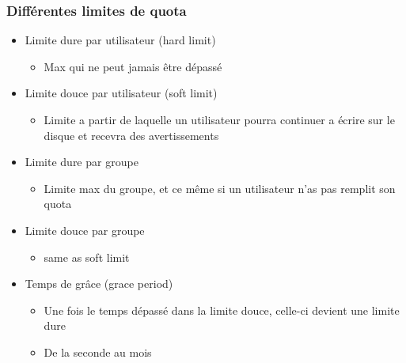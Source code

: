 \documentclass[a4paper]{article}
\begin{document}
      \subsubsection{Différentes limites de quota}
      \begin{itemize}[label=\textbullet, font=\Large]
        \item Limite dure par utilisateur (hard limit)
        \begin{itemize}[label=, font=\scriptsize] 
          \item Max qui ne peut jamais être dépassé
        \end{itemize}
        \item Limite douce par utilisateur (soft limit)
        \begin{itemize}[label=, font=\scriptsize] 
          \item Limite a partir de laquelle un utilisateur pourra continuer a écrire sur le disque et recevra des avertissements
        \end{itemize}
        \item Limite dure par groupe
        \begin{itemize}[label=, font=\scriptsize] 
          \item Limite max du groupe, et ce même si un utilisateur n'as pas remplit son quota
        \end{itemize}
        \item Limite douce par groupe
        \begin{itemize}[label=, font=\scriptsize] 
          \item same as soft limit
        \end{itemize}
        \item Temps de grâce (grace period)
        \begin{itemize}[label=, font=\scriptsize] 
          \item Une fois le temps dépassé dans la limite douce, celle-ci devient une limite dure
          \item De la seconde au mois
        \end{itemize}
      \end{itemize}
\end{document}
